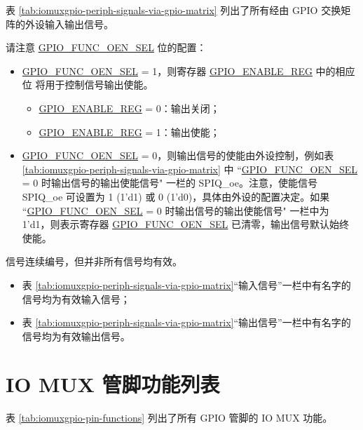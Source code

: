 \documentclass[main\_\_CN.tex]{subfiles}
\begin{document}
表 \ref{tab:iomuxgpio-periph-signals-via-gpio-matrix} 列出了所有经由 GPIO 交换矩阵的外设输入输出信号。

请注意 \hyperref[fielddesc:GPIOFUNCNOENSEL]{GPIO\_FUNC\_OEN\_SEL} 位的配置：

\begin{itemize}
    \item \hyperref[fielddesc:GPIOFUNCNOENSEL]{GPIO\_FUNC\_OEN\_SEL} = 1，则寄存器 \hyperref[regdesc:GPIOENABLEREG]{GPIO\_ENABLE\_REG} 中的相应位   将用于控制信号输出使能。
    \begin{itemize}
        \item \hyperref[regdesc:GPIOENABLEREG]{GPIO\_ENABLE\_REG} = 0：输出关闭；
        \item \hyperref[regdesc:GPIOENABLEREG]{GPIO\_ENABLE\_REG} = 1：输出使能；
    \end{itemize}
    \item \hyperref[fielddesc:GPIOFUNCNOENSEL]{GPIO\_FUNC\_OEN\_SEL} = 0，则输出信号的使能由外设控制，例如表 \ref{tab:iomuxgpio-periph-signals-via-gpio-matrix} 中 ``\hyperref[fielddesc:GPIOFUNCNOENSEL]{GPIO\_FUNC\_OEN\_SEL} = 0 时输出信号的输出使能信号" 一栏的 SPIQ\_oe。注意，使能信号 SPIQ\_oe 可设置为 1 (1'd1) 或 0 (1'd0)，具体由外设的配置决定。如果 ``\hyperref[fielddesc:GPIOFUNCNOENSEL]{GPIO\_FUNC\_OEN\_SEL} = 0 时输出信号的输出使能信号" 一栏中为 1'd1，则表示寄存器 \hyperref[fielddesc:GPIOFUNCNOENSEL]{GPIO\_FUNC\_OEN\_SEL} 已清零，输出信号默认始终使能。
\end{itemize}

\begin{tiplisting}
信号连续编号，但并非所有信号均有效。
\vspace{-1em}
\begin{itemize}
    \item 表 \ref{tab:iomuxgpio-periph-signals-via-gpio-matrix}“输入信号”一栏中有名字的信号均为有效输入信号；
    \item 表 \ref{tab:iomuxgpio-periph-signals-via-gpio-matrix}“输出信号”一栏中有名字的信号均为有效输出信号。
\end{itemize}
\end{tiplisting}

\begin{landscape}



\end{landscape}
\section{IO MUX 管脚功能列表}
\label{sec:iomux_pads}
表 \ref{tab:iomuxgpio-pin-functions} 列出了所有 GPIO 管脚的 IO MUX 功能。
\end{document}
